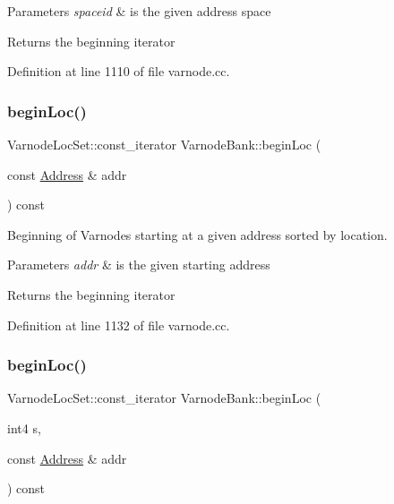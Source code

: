 \begin{DoxyParams}{Parameters}
{\em spaceid} & is the given address space \\
\hline
\end{DoxyParams}
\begin{DoxyReturn}{Returns}
the beginning iterator 
\end{DoxyReturn}


Definition at line 1110 of file varnode.\+cc.

\mbox{\label{class_varnode_bank_a10c8010d9b6fc375f83cb6605487e5bf}} 
\subsubsection{\texorpdfstring{beginLoc()}{beginLoc()}\hspace{0.1cm}{\footnotesize\ttfamily [3/6]}}
{\footnotesize\ttfamily Varnode\+Loc\+Set\+::const\+\_\+iterator Varnode\+Bank\+::begin\+Loc (\begin{DoxyParamCaption}\item[{const \mbox{\hyperlink{class_address}{Address}} \&}]{addr }\end{DoxyParamCaption}) const}



Beginning of Varnodes starting at a given address sorted by location. 


\begin{DoxyParams}{Parameters}
{\em addr} & is the given starting address \\
\hline
\end{DoxyParams}
\begin{DoxyReturn}{Returns}
the beginning iterator 
\end{DoxyReturn}


Definition at line 1132 of file varnode.\+cc.

\mbox{\label{class_varnode_bank_a136ff36679b30898f9284ad2eaea60e9}} 
\subsubsection{\texorpdfstring{beginLoc()}{beginLoc()}\hspace{0.1cm}{\footnotesize\ttfamily [4/6]}}
{\footnotesize\ttfamily Varnode\+Loc\+Set\+::const\+\_\+iterator Varnode\+Bank\+::begin\+Loc (\begin{DoxyParamCaption}\item[{int4}]{s,  }\item[{const \mbox{\hyperlink{class_address}{Address}} \&}]{addr }\end{DoxyParamCaption}) const}




